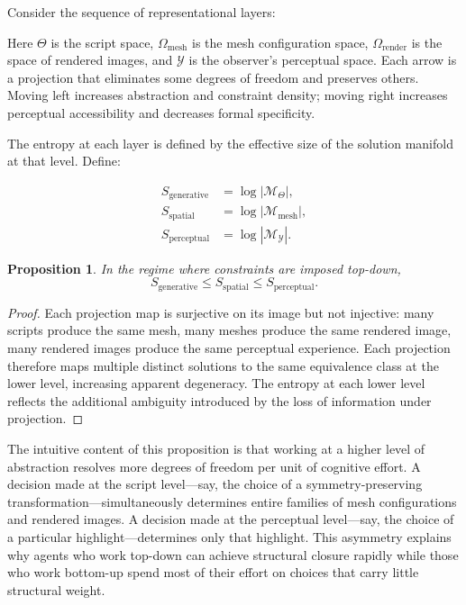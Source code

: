 \documentclass[12pt, twoside]{article}
\theoremstyle{plain}
\newtheorem{proposition}[theorem]{Proposition}
\theoremstyle{definition}
\theoremstyle{remark}
\begin{document}
Consider the sequence of representational layers:

\medskip
\begin{center}
\end{center}
\medskip

Here $\Theta$ is the script space, $\Omega_{\text{mesh}}$ is the mesh configuration space, $\Omega_{\text{render}}$ is the space of rendered images, and $\mathcal{Y}$ is the observer's perceptual space. Each arrow is a projection that eliminates some degrees of freedom and preserves others. Moving left increases abstraction and constraint density; moving right increases perceptual accessibility and decreases formal specificity.

The entropy at each layer is defined by the effective size of the solution manifold at that level. Define:

\begin{align*}
S_{\text{generative}} &= \log |\mathcal{M}_\Theta|, \\
S_{\text{spatial}} &= \log |\mathcal{M}_{\text{mesh}}|, \\
S_{\text{perceptual}} &= \log |\mathcal{M}_{\mathcal{Y}}|.
\end{align*}

\begin{proposition}
\label{prop:entropy-ordering}
In the regime where constraints are imposed top-down,
\[
S_{\text{generative}} \leq S_{\text{spatial}} \leq S_{\text{perceptual}}.
\]
\end{proposition}

\begin{proof}
Each projection map is surjective on its image but not injective: many scripts produce the same mesh, many meshes produce the same rendered image, many rendered images produce the same perceptual experience. Each projection therefore maps multiple distinct solutions to the same equivalence class at the lower level, increasing apparent degeneracy. The entropy at each lower level reflects the additional ambiguity introduced by the loss of information under projection.
\end{proof}

The intuitive content of this proposition is that working at a higher level of abstraction resolves more degrees of freedom per unit of cognitive effort. A decision made at the script level---say, the choice of a symmetry-preserving transformation---simultaneously determines entire families of mesh configurations and rendered images. A decision made at the perceptual level---say, the choice of a particular highlight---determines only that highlight. This asymmetry explains why agents who work top-down can achieve structural closure rapidly while those who work bottom-up spend most of their effort on choices that carry little structural weight.
\end{document}

